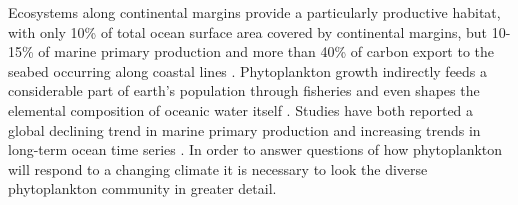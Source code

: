 Ecosystems along continental margins provide a particularly productive habitat, with only 10\% of total ocean surface area covered by continental margins, but 10-15\% of marine primary production and more than 40\% of carbon export to the seabed occurring along coastal lines \citep{Yool2001,Muller-Karger2005}. Phytoplankton growth indirectly feeds a considerable part of earth’s population through fisheries \citep{Stock2017} and even shapes the elemental composition of oceanic water itself \citep{Redfield1958}. Studies have both reported a global declining trend in marine primary production \citep{Boyce2012} and increasing trends %
in long-term ocean time series \citep{Chavez2011a}.
In order to answer questions of how phytoplankton will respond to a changing climate it is necessary to look the diverse phytoplankton community in greater detail. 

